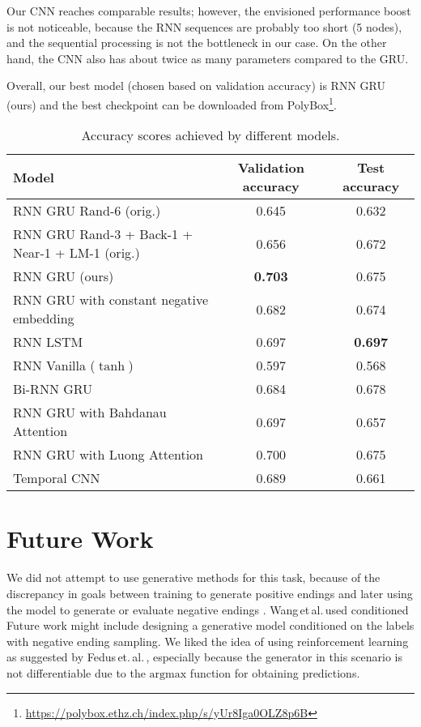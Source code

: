 \documentclass{article}
\begin{document}
Our CNN reaches comparable results; however, the envisioned performance boost is not noticeable, because the RNN sequences are probably too short (5 nodes), and the sequential processing is not the bottleneck in our case.
On the other hand, the CNN also has about twice as many parameters compared to the GRU.

Overall, our best model (chosen based on validation accuracy) is RNN GRU (ours) and the best checkpoint can be downloaded from PolyBox\footnote{\url{https://polybox.ethz.ch/index.php/s/yUr8Iga0OLZ8p6B}}.

\begin{table}[btp]\centering
\begin{tabular}{lcc}
\toprule
Model    	& Validation accuracy  	 		  & Test accuracy  					\\
\midrule
RNN GRU \citep{Roemmele2017AnTest} Rand-6 (orig.)    	& 0.645  	 		  & 0.632  \\
RNN GRU \citep{Roemmele2017AnTest} Rand-3 + Back-1
+ Near-1 + LM-1 (orig.)    	& 0.656  	 		  & 0.672  \\
\midrule

RNN GRU \citep{Roemmele2017AnTest} (ours)    	& \textbf{0.703}  	 		  & 0.675  \\
RNN GRU with constant negative embedding    	& 0.682  	 		  & 0.674 \\
RNN LSTM		& 0.697 		 	  & \textbf{0.697} \\
RNN Vanilla ($\tanh$)		& 0.597 		 	  & 0.568  \\
Bi-RNN GRU		& 0.684   			  & 0.678  \\
RNN GRU with Bahdanau \citep{Bahdanau2016End-to-EndRecognition} Attention     	& 0.697	 	 		  & 0.657  \\
RNN GRU with Luong \citep{Luong2015EffectiveTranslation} Attention    	& 0.700	 	 		  & 0.675  \\
\midrule
Temporal CNN   	& 0.689	 	 		  & 0.661\\\bottomrule
\end{tabular}
\caption{Accuracy scores achieved by different models.}\label{tab:results}
\end{table}

\section{Future Work}\label{sec:futurework}
We did not attempt to use generative methods for this task, because of the discrepancy in goals between training
to generate positive endings and later using the model to generate or evaluate negative endings \citep{Wang2017ConditionalComprehension}. Wang\,et\,al.\,used conditioned
Future work might include designing a generative model conditioned on the labels with negative ending sampling.
We liked the idea of using reinforcement learning as suggested by Fedus\,et.\,al.\,\citep{Fedus2018MaskGAN:_______},
especially because the generator in this scenario is not differentiable due to the $\mathrm{argmax}$ function for obtaining predictions.
\end{document}
